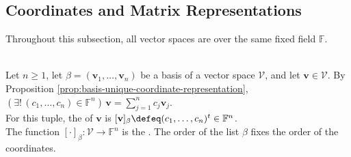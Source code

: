 \subsection{Coordinates and Matrix Representations}
Throughout this subsection, all vector spaces are over the same fixed field $\mathbb{F}$.

\begin{definition} \label{def:coordinate-vector-and-coordinate-map} \\
Let $n\geq1$, let $\beta=(\mathbf{v}_1,\ldots,\mathbf{v}_n)$ be a basis of a vector space $\mathcal{V}$, and let $\mathbf{v}\in\mathcal{V}$. By Proposition \ref{prop:basis-unique-coordinate-representation}, $(\exists!\,(c_1,\ldots,c_n)\in\mathbb{F}^n)\,\mathbf{v}=\sum\limits_{j=1}^{n}c_j\mathbf{v}_j$.\\
For this tuple, the  of $\mathbf{v}$ is $[\mathbf{v}]_{\beta}\defeq(c_1,\ldots,c_n)^t\in\mathbb{F}^n$.\\
The function $[\cdot]_{\beta}:\mathcal{V}\to\mathbb{F}^n$ is the . The order of the list $\beta$ fixes the order of the coordinates.
\end{definition}

